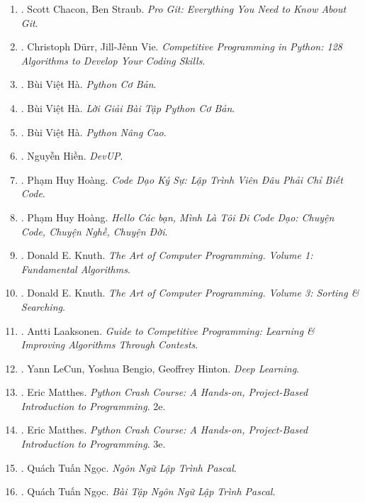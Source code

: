 \documentclass{article}
\begin{document}
\begin{enumerate}
	\item \cite{Chacon_Straub2014}. Scott Chacon, Ben Straub. {\it Pro Git: Everything You Need to Know About Git}.\hfill{\sf[reading]}
	\item \cite{Durr_Vie2021}. Christoph D\"urr, Jill-J\^enn Vie. {\it Competitive Programming in Python: 128 Algorithms to Develop Your Coding Skills}.\\\mbox{}\hfill{\sf[reading]}
	\item \cite{Ha_Python_co_ban}. Bùi Việt Hà. {\it Python Cơ Bản}.\hfill{\sf[done]}
	\item \cite{Ha_loi_giai_BT_Python_co_ban}. Bùi Việt Hà. {\it Lời Giải Bài Tập Python Cơ Bản}.\hfill{\sf[reading]}
	\item \cite{Ha_Python_nang_cao}. Bùi Việt Hà. {\it Python Nâng Cao}.\hfill{\sf[done]}
	\item \cite{Hien_DevUp}. Nguyễn Hiền. {\it DevUP}.\hfill{\sf[done]}
	\item \cite{Hoang_code_dao_ky_su}. Phạm Huy Hoàng. {\it Code Dạo Ký Sự: Lập Trình Viên Đâu Phải Chỉ Biết Code}.\hfill{\sf[done]}
	\item \cite{Hoang_toi_di_code_dao}. Phạm Huy Hoàng. {\it Hello Các bạn, Mình Là Tôi Đi Code Dạo: Chuyện Code, Chuyện Nghề, Chuyện Đời}.\hfill{\sf[done]}
	\item \cite{Knuth1997}. Donald E. Knuth. {\it The Art of Computer Programming. Volume 1: Fundamental Algorithms}.\hfill{\sf[reading]}
	\item \cite{Knuth1998}. Donald E. Knuth. {\it The Art of Computer Programming. Volume 3: Sorting \& Searching}.\hfill{\sf[reading]}
	\item \cite{Laaksonen2020}. Antti Laaksonen. {\it Guide to Competitive Programming: Learning \& Improving Algorithms Through Contests}.\hfill{\sf[reading]}
	\item \cite{LeCun_Bengio_Hinton2015}. Yann LeCun, Yoshua Bengio, Geoffrey Hinton. {\it Deep Learning}.\hfill{\sf[reading]}
	\item \cite{Matthes2019}. Eric Matthes. {\it Python Crash Course: A Hands-on, Project-Based Introduction to Programming}. 2e.\hfill{\sf[reading]}
	\item \cite{Matthes2023}. Eric Matthes. {\it Python Crash Course: A Hands-on, Project-Based Introduction to Programming}. 3e.\hfill{\sf[reading]}
	\item \cite{Ngoc_Pascal}. Quách Tuấn Ngọc. {\it Ngôn Ngữ Lập Trình Pascal}.\hfill{\sf[reading]}
	\item \cite{Ngoc_BT_Pascal}. Quách Tuấn Ngọc. {\it Bài Tập Ngôn Ngữ Lập Trình Pascal}.\hfill{\sf[reading]}

\end{enumerate}
\end{document}
